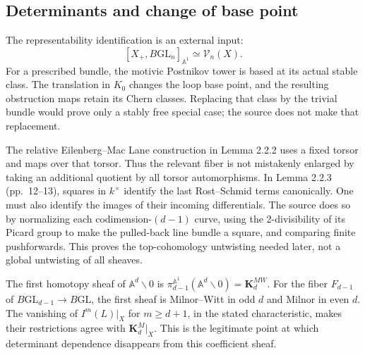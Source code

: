 \documentclass[10pt]{article}
\begin{document}
\subsection*{Determinants and change of base point}
The representability identification is an external input: \[[X_+,B\mathrm{GL}_n]_{\mathbb A^1}\simeq\mathcal V_n(X).\] For a prescribed bundle, the motivic Postnikov tower is based at its actual stable class. The translation in \(K_0\) changes the loop base point, and the resulting obstruction maps retain its Chern classes. Replacing that class by the trivial bundle would prove only a stably free special case; the source does not make that replacement.\par
The relative Eilenberg–Mac Lane construction in Lemma 2.2.2 uses a fixed torsor and maps over that torsor. Thus the relevant fiber is not mistakenly enlarged by taking an additional quotient by all torsor automorphisms. In Lemma 2.2.3 (pp. 12–13), squares in \(k^\times\) identify the last Rost–Schmid terms canonically. One must also identify the images of their incoming differentials. The source does so by normalizing each codimension-\((d-1)\) curve, using the 2-divisibility of its Picard group to make the pulled-back line bundle a square, and comparing finite pushforwards. This proves the top-cohomology untwisting needed later, not a global untwisting of all sheaves.\par
The first homotopy sheaf of \(\mathbb A^d\smallsetminus0\) is \(\pi^{\mathbb A^1}_{d-1}(\mathbb A^d\smallsetminus0)=\mathbf K_d^{MW}\). For the fiber \(F_{d-1}\) of \(B\mathrm{GL}_{d-1}\to B\mathrm{GL}\), the first sheaf is Milnor–Witt in odd \(d\) and Milnor in even \(d\). The vanishing of \(I^m(L)|_X\) for \(m\geq d+1\), in the stated characteristic, makes their restrictions agree with \(\mathbf K_d^M|_X\). This is the legitimate point at which determinant dependence disappears from this coefficient sheaf.\par
\end{document}
